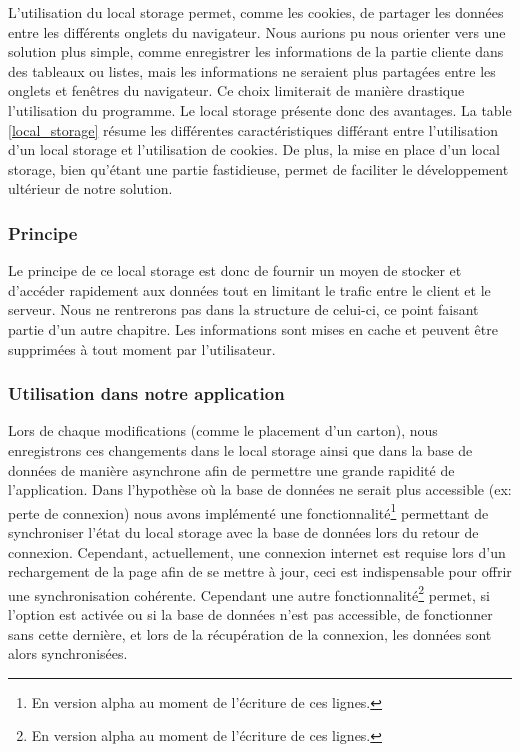 


L'utilisation du local storage permet, comme les cookies, de partager les données entre les différents onglets du navigateur. Nous aurions pu nous orienter vers une solution plus simple, comme enregistrer les informations de la partie cliente dans des tableaux ou listes, mais les informations ne seraient plus partagées entre les onglets et fenêtres du navigateur. Ce choix limiterait de manière drastique l'utilisation du programme. 
\newline
\indent
Le local storage présente donc des avantages. La table \ref{local_storage} résume les différentes caractéristiques différant entre l'utilisation d'un local storage et l'utilisation de cookies.
\newline
\indent
De plus, la mise en place d'un local storage, bien qu'étant une partie fastidieuse, permet de faciliter le développement ultérieur de notre solution.

  
\subsubsection{Principe}

Le principe de ce local storage est donc de fournir un moyen de stocker et d'accéder rapidement aux données tout en limitant le trafic entre le client et le serveur. Nous ne rentrerons pas dans la structure de celui-ci, ce point faisant partie d'un autre chapitre. Les informations sont mises en cache et peuvent être supprimées à tout moment par l'utilisateur.

\subsubsection{Utilisation dans notre application}
Lors de chaque modifications (comme le placement d'un carton), nous enregistrons ces changements dans le local storage ainsi que dans la base de données de manière asynchrone afin de permettre une grande rapidité de l'application. 
\newline
\indent
Dans l'hypothèse où la base de données ne serait plus accessible (ex: perte de connexion) nous avons implémenté une fonctionnalité\footnote{En version alpha au moment de l'écriture de ces lignes.} permettant de synchroniser l'état du local storage avec la base de données lors du retour de connexion.
\newline
\indent
Cependant, actuellement, une connexion internet est requise lors d'un rechargement de la page afin de se mettre à jour, ceci est indispensable pour offrir une synchronisation cohérente. Cependant une autre fonctionnalité\footnote{En version alpha au moment de l'écriture de ces lignes.} permet, si l'option est activée ou si la base de données n'est pas accessible, de fonctionner sans cette dernière, et lors de la récupération de la connexion, les données sont alors synchronisées.



